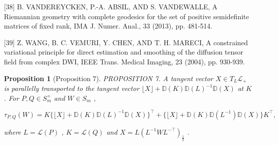 \documentclass[11pt]{article}
\newtheorem{proposition}{Proposition}
\begin{document}
[38] B. VANDEREYCKEN, P.-A. ABSIL, AND S. VANDEWALLE, A Riemannian geometry with complete geodesics for the set of positive semidefinite matrices of fixed rank, IMA J. Numer. Anal., 33 (2013), pp. 481-514.

[39] Z. WANG, B. C. VEMURI, Y. CHEN, AND T. H. MARECI, A constrained variational principle for direct estimation and smoothing of the diffusion tensor field from complex DWI, IEEE Trans. Medical Imaging, 23 (2004), pp. 930-939.


\begin{proposition}[Proposition 7]
PROPOSITION 7. A tangent vector  $X \in T_{L}\mathcal{L}_{+}$  is parallelly transported to the tangent vector  $\lfloor X\rfloor + \mathbb{D}(K)\mathbb{D}(L)^{-1}\mathbb{D}(X)$  at  $K$ . For  $P, Q \in S_m^+$  and  $W \in S_m$ ,

$$
\tau_ {P, Q} (W) = K \{\lfloor X \rfloor + \mathbb {D} (K) \mathbb {D} (L) ^ {- 1} \mathbb {D} (X) \} ^ {\top} + \{\lfloor X \rfloor + \mathbb {D} (K) \mathbb {D} (L ^ {- 1}) \mathbb {D} (X) \} K ^ {\top},
$$

where  $L = \mathcal{L}(P)$ ,  $K = \mathcal{L}(Q)$  and  $X = L(L^{-1}WL^{-\top})_{\frac{1}{2}}$ .
\end{proposition}
\end{document}
